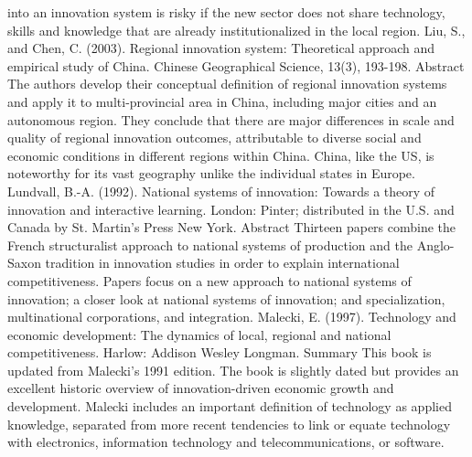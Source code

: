\documentclass[a4paper,11pt]{article}
\begin{document}
into an innovation system is risky if the new sector does not share technology, skills and knowledge that are already institutionalized in the local region.
Liu, S., and Chen, C. (2003). Regional innovation system: Theoretical approach and empirical study of China. Chinese Geographical Science, 13(3), 193-198.
Abstract
The authors develop their conceptual definition of regional innovation systems and apply it to multi-provincial area in China, including major cities and an autonomous region. They conclude that there are major differences in scale and quality of regional innovation outcomes, attributable to diverse social and economic conditions in different regions within China. China, like the US, is noteworthy for its vast geography unlike the individual states in Europe.
Lundvall, B.-A. (1992). National systems of innovation: Towards a theory of innovation and interactive learning. London: Pinter; distributed in the U.S. and Canada by St. Martin's Press New York.
Abstract
Thirteen papers combine the French structuralist approach to national systems of production and the Anglo-Saxon tradition in innovation studies in order to explain international competitiveness. Papers focus on a new approach to national systems of innovation; a closer look at national systems of innovation; and specialization, multinational corporations, and integration.
Malecki, E. (1997). Technology and economic development: The dynamics of local, regional and national competitiveness. Harlow: Addison Wesley Longman.
Summary
This book is updated from Malecki’s 1991 edition. The book is slightly dated but provides an excellent historic overview of innovation-driven economic growth and development. Malecki includes an important definition of technology as applied knowledge, separated from more recent tendencies to link or equate technology with electronics, information technology and telecommunications, or software.
 
\end{document}
